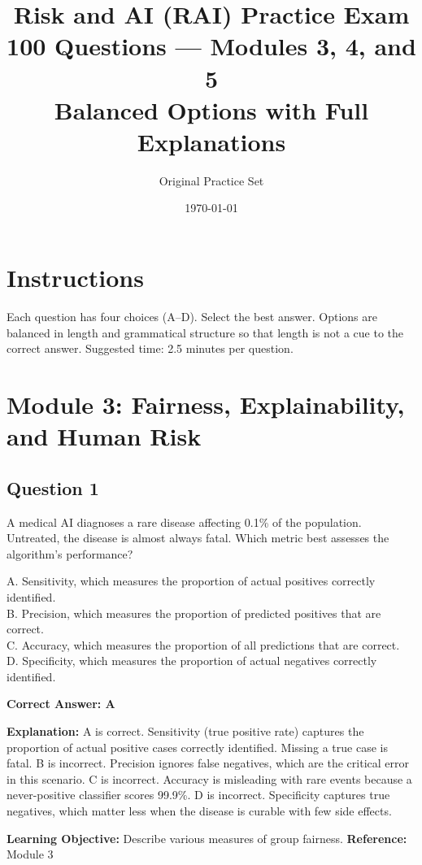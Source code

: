 \documentclass[11pt]{article}
\title{\textbf{Risk and AI (RAI) Practice Exam}\\
	\large 100 Questions — Modules 3, 4, and 5\\
	\normalsize Balanced Options with Full Explanations}
\author{Original Practice Set}
\date{\today}
\begin{document}
	\maketitle
	
	\section*{Instructions}
	Each question has four choices (A--D). Select the best answer.
	Options are balanced in length and grammatical structure so that length
	is not a cue to the correct answer. Suggested time: 2.5 minutes per question.
	
	\newpage
	\section{Module 3: Fairness, Explainability, and Human Risk}
	
	\subsection*{Question 1}
	A medical AI diagnoses a rare disease affecting 0.1\% of the population.
	Untreated, the disease is almost always fatal. Which metric best assesses
	the algorithm's performance?
	
	A. Sensitivity, which measures the proportion of actual positives correctly identified.\\
	B. Precision, which measures the proportion of predicted positives that are correct.\\
	C. Accuracy, which measures the proportion of all predictions that are correct.\\
	D. Specificity, which measures the proportion of actual negatives correctly identified.
	
	\vspace{0.4em}
	\textbf{Correct Answer: A}
	
	\textbf{Explanation:}
	A is correct. Sensitivity (true positive rate) captures the proportion of
	actual positive cases correctly identified. Missing a true case is fatal.
	B is incorrect. Precision ignores false negatives, which are the critical
	error in this scenario.
	C is incorrect. Accuracy is misleading with rare events because a
	never-positive classifier scores 99.9\%.
	D is incorrect. Specificity captures true negatives, which matter less
	when the disease is curable with few side effects.
	
	\textbf{Learning Objective:} Describe various measures of group fairness.
	\textbf{Reference:} Module 3
	
\end{document}
